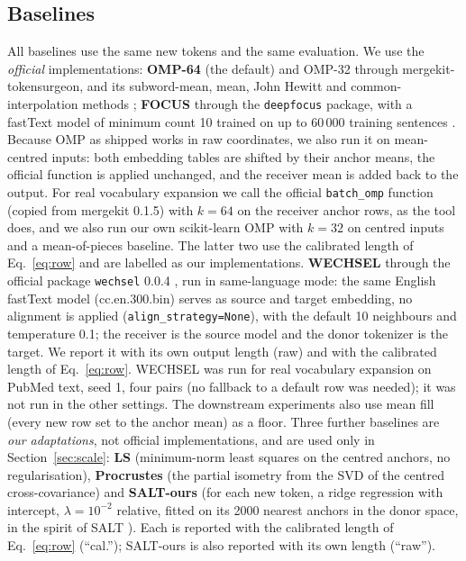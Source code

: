 \documentclass[preprint,12pt]{elsarticle}
\begin{document}
\subsection{Baselines}
All baselines use the same new tokens and the same evaluation. We use the \emph{official} implementations: \textbf{OMP-64} (the default) and OMP-32 through mergekit-tokensurgeon, and its subword-mean, mean, John Hewitt and common-interpolation methods \cite{goddard2024mergekit}; \textbf{FOCUS} through the \texttt{deepfocus} package, with a fastText model of minimum count 10 trained on up to 60\,000 training sentences \cite{dobler2023focus}. Because OMP as shipped works in raw coordinates, we also run it on mean-centred inputs: both embedding tables are shifted by their anchor means, the official function is applied unchanged, and the receiver mean is added back to the output. For real vocabulary expansion we call the official \texttt{batch\_omp} function (copied from mergekit 0.1.5) with $k=64$ on the receiver anchor rows, as the tool does, and we also run our own scikit-learn OMP with $k=32$ on centred inputs and a mean-of-pieces baseline. The latter two use the calibrated length of Eq.~\eqref{eq:row} and are labelled as our implementations. \textbf{WECHSEL} through the official package \texttt{wechsel} 0.0.4 \cite{minixhofer2022wechsel}, run in same-language mode: the same English fastText model (cc.en.300.bin) serves as source and target embedding, no alignment is applied (\texttt{align\_strategy=None}), with the default 10 neighbours and temperature 0.1; the receiver is the source model and the donor tokenizer is the target. We report it with its own output length (raw) and with the calibrated length of Eq.~\eqref{eq:row}. WECHSEL was run for real vocabulary expansion on PubMed text, seed 1, four pairs (no fallback to a default row was needed); it was not run in the other settings. The downstream experiments also use mean fill (every new row set to the anchor mean) as a floor. Three further baselines are \emph{our adaptations}, not official implementations, and are used only in Section~\ref{sec:scale}: \textbf{LS} (minimum-norm least squares on the centred anchors, no regularisation), \textbf{Procrustes} (the partial isometry from the SVD of the centred cross-covariance) and \textbf{SALT-ours} (for each new token, a ridge regression with intercept, $\lambda=10^{-2}$ relative, fitted on its 2000 nearest anchors in the donor space, in the spirit of SALT \cite{lee2025salt}). Each is reported with the calibrated length of Eq.~\eqref{eq:row} (``cal.''); SALT-ours is also reported with its own length (``raw'').
\end{document}
